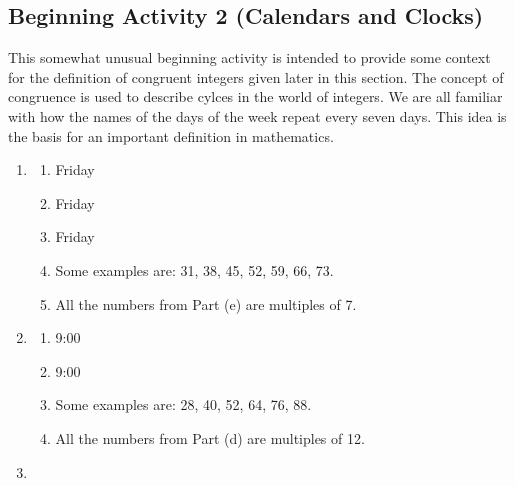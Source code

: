 \documentclass[11pt]{article}
\begin{document}
\subsection*{Beginning Activity 2 (Calendars and Clocks)}
This somewhat unusual beginning activity is intended to provide some context for the definition of congruent integers given later in this section.  The concept of congruence is used to describe cylces in the world of integers.  We are all familiar with how the names of the days of the week repeat every seven days.  This idea is the basis for an important definition in mathematics.
\begin{enumerate}
\item \begin{multicols}{3} 
\begin{enumerate}
\item Friday

\item Friday

\item Friday
\end{enumerate}
\end{multicols}

\begin{enumerate}
\setcounter{enumii}{3}
\item Some examples are: 31, 38, 45, 52, 59, 66, 73.

\addtocounter{enumii}{1}
\item All the numbers from Part (e) are multiples of 7.
\end{enumerate}

\item \begin{multicols}{2} 
\begin{enumerate}

\item 9:00

\item 9:00
\end{enumerate}
\end{multicols}

\begin{enumerate}
\setcounter{enumii}{2}
\item Some examples are: 28, 40, 52, 64, 76, 88.

\addtocounter{enumii}{1}
\item All the numbers from Part (d) are multiples of 12.
\end{enumerate}

\item \begin{multicols}{2} 
\begin{enumerate}


\end{enumerate}
\end{multicols}
\end{enumerate}
\end{document}
